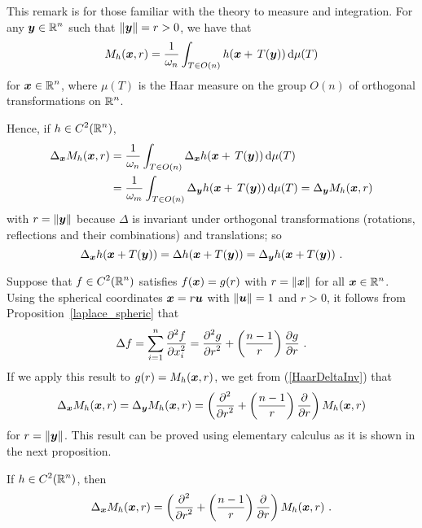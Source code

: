 \begin{rmk}
This remark is for those familiar with the theory to measure and
integration.
For any $\displaystyle {\bm{y}} \in \mathbb{R}^n$ such that
$\|{\bm{y}}\| = r> 0$, we have that
\[
M_h({\bm{x}},r) =
\frac{1}{\omega_n} \int_{T\in O(n)} h({\bm{x}}+\,T({\bm{y}}))
\,\mathrm{d}{\mu(T)}
\]
for $\displaystyle {\bm{x}}\in\mathbb{R}^n$,
where $\mu(T)$ is the Haar measure on the group $O(n)$ of orthogonal
transformations on $\displaystyle \mathbb{R}^n$.

Hence, if $\displaystyle h \in C^2(\mathbb{R}^n)$,
\begin{align}
\Delta_{{\bm{x}}} M_h({\bm{x}},r)
&= \frac{1}{\omega_n} \int_{T\in O(n)} \Delta_{{\bm{x}}} h({\bm{x}}+\,T({\bm{y}}))
\,\mathrm{d}{\mu(T)} \nonumber \\
&= \frac{1}{\omega_m} \int_{T\in O(n)} \Delta_{{\bm{y}}} h({\bm{x}}+\,T({\bm{y}}))
\,\mathrm{d}{\mu(T)}
= \Delta_{{\bm{y}}} M_h({\bm{x}},r) \label{HaarDeltaInv}
\end{align}
with $r = \|{\bm{y}}\|$ because $\Delta$ is invariant under orthogonal
transformations (rotations, reflections and their combinations) and
translations; so
\[
\Delta_{{\bm{x}}} h({\bm{x}}+T({\bm{y}})) = \Delta h({\bm{x}}+T({\bm{y}}))
= \Delta_{{\bm{y}}} h({\bm{x}}+T({\bm{y}})) \ .
\]

Suppose that $\displaystyle f \in C^2(\mathbb{R}^n)$ satisfies $f({\bm{x}}) = g(r)$ with
$r=\|{\bm{x}}\|$ for all $\displaystyle {\bm{x}} \in \mathbb{R}^n$.
Using the spherical coordinates ${\bm{x}} = r {\bm{u}}$ with
$\|{\bm{u}}\|= 1$ and $r>0$, it follows from
Proposition~\ref{laplace_spheric} that
\[
  \Delta f = \sum_{i=1}^n \pdydxn{f}{x_i}{2} 
= \pdydxn{g}{r}{2} + \left(\frac{n-1}{r}\right) \pdydx{g}{r} \ .
\]
If we apply this result to $g(r) = M_h({\bm{x}},r)$, 
we get from (\ref{HaarDeltaInv}) that
\[
\Delta_{{\bm{x}}} M_h({\bm{x}},r) = \Delta_{{\bm{y}}} M_h({\bm{x}},r)
= \left( \frac{\displaystyle \partial^{2}{}} {\displaystyle \partial r^{2}} + \left(\frac{n-1}{r}\right) \frac{\partial{}}{\partial r} \right)
M_h({\bm{x}},r)
\]
for $r = \|{\bm{y}}\|$.  This result can be proved using elementary
calculus as it is shown in the next proposition.
\end{rmk}

\begin{prop} \label{wave_sol_pr1}
If $\displaystyle h \in C^2(\mathbb{R}^n)$, then
\[
\Delta_{{\bm{x}}} M_h({\bm{x}},r)
= \left( \frac{\displaystyle \partial^{2}{}} {\displaystyle \partial r^{2}} + \left(\frac{n-1}{r}\right) \frac{\partial{}}{\partial r} \right)
M_h({\bm{x}},r) \ .
\]
\end{prop}

